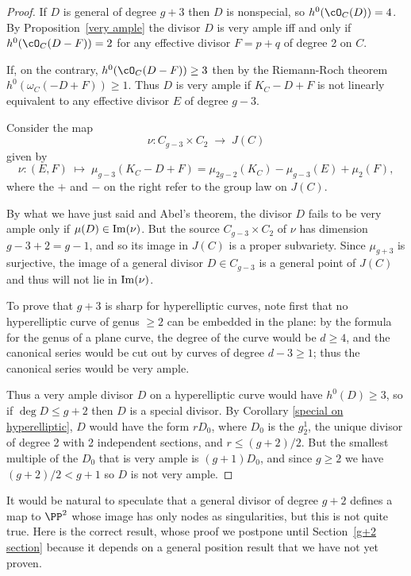 \begin{proof}
If $D$ is general of degree $g+3$ then $D$ is nonspecial, so $h^0(\cO_C(D)) = 4$. By Proposition~\ref{very ample} the divisor
$D$ is very ample iff and only if $h^0(\cO_C(D-F)) = 2$
for any effective divisor $F = p+q$ of degree 2 on $C$.

If, on the contrary, $h^0(\cO_C(D-F)) \geq 3$ then by the Riemann-Roch theorem $h^0(\omega_C(-D + F)) \geq 1$. Thus $D$ is very ample if $K_C - D + F$ is not linearly equivalent to 
any effective divisor $E$ of degree $g-3$.

Consider the map 
$$
\nu : C_{g-3} \times C_{2} \; \to \; J(C)
$$
given by
$$
\nu : (E,F) \; \mapsto \; \mu_{g-3}(K_C - D + F) = \mu_{2g-2}(K_C) - \mu_{g-3}(E) + \mu_{2}(F), 
$$
where the $+$ and $-$ on the right refer to the group law on $J(C)$. 

By what we have just said and Abel's theorem, the divisor $D$ fails to be very ample only if
$\mu(D) \in {\rm Im}(\nu)$. But the source $C_{g-3} \times C_{2}$ of $\nu$ has dimension $g-3+2 = g-1$, and so its image in $J(C)$ is a proper subvariety. Since $\mu_{g+3}$ is surjective, the image of a general divisor $D \in C_{g-3}$ is a general point of $J(C)$ and thus will not lie in ${\rm Im}(\nu)$. 

To prove that $g+3$ is sharp for hyperelliptic curves, note first that no hyperelliptic curve of genus $\geq 2$ can
be embedded in the plane: by the formula for the genus of a plane curve, the degree of the curve would be $d \geq 4$, and the canonical series would be cut out by curves of degree $d-3\geq 1$; thus the canonical series would be very ample.

Thus a very ample divisor $D$ on a hyperelliptic curve would have $h^0(D) \geq 3$, so if $\deg D \leq g+2$
then $D$ is a special divisor. By Corollary \ref{special on hyperelliptic}, $D$ would have the form
$rD_0$, where $D_0$ is the $g^1_2$, the unique divisor of degree 2 with 2 independent sections,
and $r \leq (g+2)/2$. But the smallest multiple of the $D_0$ that is very ample is $(g+1)D_0$, and
since $g\geq 2$ we have $(g+2)/2 < g+1$ so $D$ is not very ample.
\end{proof}

It would be natural to speculate that a general divisor of degree $g+2$ defines a map to $\PP^2$ whose
image has only nodes as singularities, but this is not quite true. Here is the correct result,
whose proof we postpone until Section~\ref{g+2 section} because it depends on a general position result that we have not yet proven.

